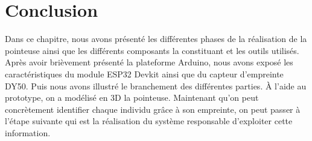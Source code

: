 \section{Conclusion}
Dans ce chapitre, nous avons présenté les différentes phases de la réalisation 
de la pointeuse ainsi que les différents composants la constituant et les outils 
utilisés. Après avoir brièvement présenté la plateforme Arduino, nous avons 
exposé les caractéristiques du module ESP32 Devkit ainsi que du capteur 
d’empreinte DY50. Puis nous avons illustré le branchement des différentes 
parties. À l’aide au prototype, on a modélisé en 3D la pointeuse.
Maintenant qu’on peut concrètement identifier chaque individu grâce à son 
empreinte, on peut passer à l’étape suivante qui est la réalisation du système 
responsable d’exploiter cette information.  

